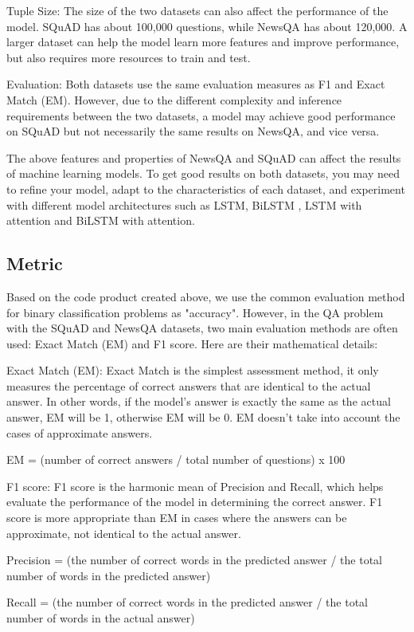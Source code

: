 \documentclass[11pt]{article}
\begin{document}
Tuple Size: The size of the two datasets can also affect the performance of the model. SQuAD has about 100,000 questions, while NewsQA has about 120,000. A larger dataset can help the model learn more features and improve performance, but also requires more resources to train and test.

Evaluation: Both datasets use the same evaluation measures as F1 and Exact Match (EM). However, due to the different complexity and inference requirements between the two datasets, a model may achieve good performance on SQuAD but not necessarily the same results on NewsQA, and vice versa.

The above features and properties of NewsQA and SQuAD can affect the results of machine learning models. To get good results on both datasets, you may need to refine your model, adapt to the characteristics of each dataset, and experiment with different model architectures such as LSTM, BiLSTM , LSTM with attention and BiLSTM with attention.
\subsection{Metric}
 Based on the code product created above, we use the common evaluation method for binary classification problems as "accuracy". However, in the QA problem with the SQuAD and NewsQA datasets, two main evaluation methods are often used: Exact Match (EM) and F1 score. Here are their mathematical details:

Exact Match (EM):
Exact Match is the simplest assessment method, it only measures the percentage of correct answers that are identical to the actual answer. In other words, if the model's answer is exactly the same as the actual answer, EM will be 1, otherwise EM will be 0. EM doesn't take into account the cases of approximate answers.

EM = (number of correct answers / total number of questions) x 100

F1 score:
F1 score is the harmonic mean of Precision and Recall, which helps evaluate the performance of the model in determining the correct answer. F1 score is more appropriate than EM in cases where the answers can be approximate, not identical to the actual answer.

Precision = (the number of correct words in the predicted answer / the total number of words in the predicted answer)

Recall = (the number of correct words in the predicted answer / the total number of words in the actual answer)
\end{document}
